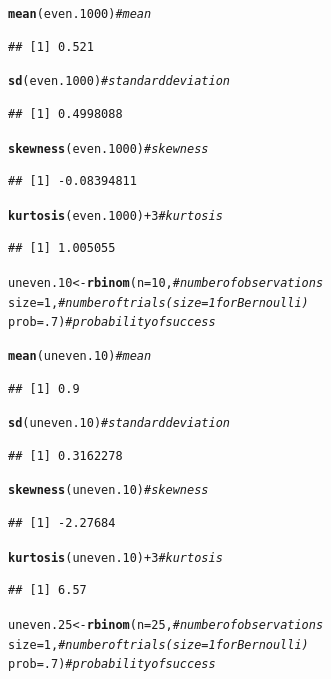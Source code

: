 \documentclass{article}\usepackage[]{graphicx}\usepackage[]{color}
\makeatletter
\newcommand{\hlnum}[1]{\textcolor[rgb]{0.686,0.059,0.569}{#1}}%
\newcommand{\hlcom}[1]{\textcolor[rgb]{0.678,0.584,0.686}{\textit{#1}}}%
\newcommand{\hlopt}[1]{\textcolor[rgb]{0,0,0}{#1}}%
\newcommand{\hlstd}[1]{\textcolor[rgb]{0.345,0.345,0.345}{#1}}%
\newcommand{\hlkwb}[1]{\textcolor[rgb]{0.69,0.353,0.396}{#1}}%
\newcommand{\hlkwc}[1]{\textcolor[rgb]{0.333,0.667,0.333}{#1}}%
\newcommand{\hlkwd}[1]{\textcolor[rgb]{0.737,0.353,0.396}{\textbf{#1}}}%
\newenvironment{kframe}{%
 \def\at@end@of@kframe{}%
 \ifinner\ifhmode%
  \def\at@end@of@kframe{\end{minipage}}%
  \begin{minipage}{\columnwidth}%
 \fi\fi%
 \def\FrameCommand##1{\hskip\@totalleftmargin \hskip-\fboxsep
 \colorbox{shadecolor}{##1}\hskip-\fboxsep
     \hskip-\linewidth \hskip-\@totalleftmargin \hskip\columnwidth}%
 \MakeFramed {\advance\hsize-\width
   \@totalleftmargin\z@ \linewidth\hsize
   \@setminipage}}%
 {\par\unskip\endMakeFramed%
 \at@end@of@kframe}
\newenvironment{knitrout}{}{} %
\makeatother
\begin{document}
\begin{enumerate}
\begin{enumerate}
\begin{knitrout}
\begin{kframe}
\begin{alltt}
\hlkwd{mean}\hlstd{(even.1000)}                  \hlcom{#mean}
\end{alltt}
\begin{verbatim}
## [1] 0.521
\end{verbatim}
\begin{alltt}
\hlkwd{sd}\hlstd{(even.1000)}                    \hlcom{#standard deviation}
\end{alltt}
\begin{verbatim}
## [1] 0.4998088
\end{verbatim}
\begin{alltt}
\hlkwd{skewness}\hlstd{(even.1000)}              \hlcom{#skewness}
\end{alltt}
\begin{verbatim}
## [1] -0.08394811
\end{verbatim}
\begin{alltt}
\hlkwd{kurtosis}\hlstd{(even.1000)}\hlopt{+}\hlnum{3}            \hlcom{#kurtosis}
\end{alltt}
\begin{verbatim}
## [1] 1.005055
\end{verbatim}
\begin{alltt}
\hlstd{uneven.10} \hlkwb{<-} \hlkwd{rbinom}\hlstd{(}\hlkwc{n}\hlstd{=}\hlnum{10}\hlstd{,}        \hlcom{#number of observations}
                  \hlkwc{size}\hlstd{=}\hlnum{1}\hlstd{,}        \hlcom{#number of trials (size=1 for Bernoulli)}
                  \hlkwc{prob}\hlstd{=}\hlnum{.7}\hlstd{)}       \hlcom{#probability of success}

\hlkwd{mean}\hlstd{(uneven.10)}                  \hlcom{#mean}
\end{alltt}
\begin{verbatim}
## [1] 0.9
\end{verbatim}
\begin{alltt}
\hlkwd{sd}\hlstd{(uneven.10)}                    \hlcom{#standard deviation}
\end{alltt}
\begin{verbatim}
## [1] 0.3162278
\end{verbatim}
\begin{alltt}
\hlkwd{skewness}\hlstd{(uneven.10)}              \hlcom{#skewness}
\end{alltt}
\begin{verbatim}
## [1] -2.27684
\end{verbatim}
\begin{alltt}
\hlkwd{kurtosis}\hlstd{(uneven.10)}\hlopt{+}\hlnum{3}            \hlcom{#kurtosis}
\end{alltt}
\begin{verbatim}
## [1] 6.57
\end{verbatim}
\begin{alltt}
\hlstd{uneven.25}  \hlkwb{<-} \hlkwd{rbinom}\hlstd{(}\hlkwc{n}\hlstd{=}\hlnum{25}\hlstd{,}       \hlcom{#number of observations}
                   \hlkwc{size}\hlstd{=}\hlnum{1}\hlstd{,}       \hlcom{#number of trials (size=1 for Bernoulli)}
                   \hlkwc{prob}\hlstd{=}\hlnum{.7}\hlstd{)}      \hlcom{#probability of success}


\end{alltt}
\end{kframe}
\end{knitrout}
\end{enumerate}
\end{enumerate}
\end{document}
